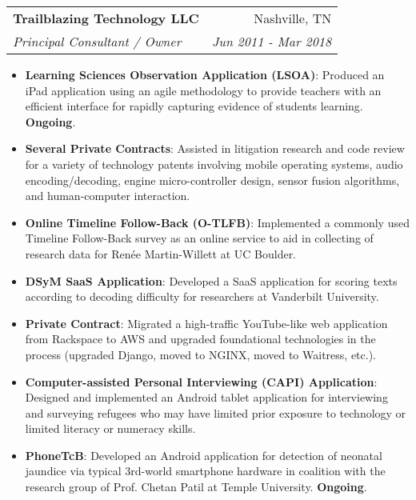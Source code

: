 \documentclass[letterpaper,10pt]{article}
\makeatletter
\newcommand{\resumeItem}[2]{
  \item\small{
    \textbf{#1}{: #2 \vspace{-2pt}}
  }
}
\newcommand{\resumeSubheading}[4]{
  \vspace{-1pt}\item
    \begin{tabular*}{0.97\textwidth}{l@{\extracolsep{\fill}}r}
      \textbf{#1} & #2 \\
      \textit{\small#3} & \textit{\small #4} \\
    \end{tabular*}\vspace{-5pt}
}
\newcommand{\resumeItemListStart}{\begin{itemize}}
\newcommand{\resumeItemListEnd}{\end{itemize}\vspace{-5pt}}
\makeatother
\begin{document}
    \resumeSubheading
      {Trailblazing Technology LLC}{Nashville, TN}
      {Principal Consultant / Owner}{Jun 2011 - Mar 2018}
      \resumeItemListStart
        \resumeItem{Learning Sciences Observation Application (LSOA)}
          {Produced an iPad application using an agile methodology to provide teachers with an efficient interface for rapidly capturing evidence of students learning. \textbf{Ongoing}.}
        \resumeItem{Several Private Contracts}
          {Assisted in litigation research and code review for a variety of technology patents involving mobile operating systems, audio encoding/decoding, engine micro-controller design, sensor fusion algorithms, and human-computer interaction.}
        \resumeItem{Online Timeline Follow-Back (O-TLFB)}
          {Implemented a commonly used Timeline Follow-Back survey as an online service to aid in collecting of research data for Renée Martin-Willett at UC Boulder.}
        \resumeItem{DSyM SaaS Application}
          {Developed a SaaS application for scoring texts according to decoding difficulty for researchers at Vanderbilt University.}
        \resumeItem{Private Contract}
          {Migrated a high-traffic YouTube-like web application from Rackspace to AWS and upgraded foundational technologies in the process (upgraded Django, moved to NGINX, moved to Waitress, etc.).}
        \resumeItem{Computer-assisted Personal Interviewing (CAPI) Application}
          {Designed and implemented an Android tablet application for interviewing and surveying refugees who may have limited prior exposure to technology or limited literacy or numeracy skills.}
        \resumeItem{PhoneTcB}
          {Developed an Android application for detection of neonatal jaundice via typical 3rd-world smartphone hardware in coalition with the research group of Prof. Chetan Patil at Temple University. \textbf{Ongoing}.}
      \resumeItemListEnd
\end{document}
